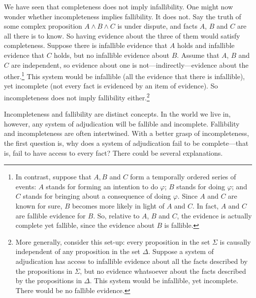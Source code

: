 \documentclass[
  10pt,
  dvipsnames,enabledeprecatedfontcommands]{scrartcl}
\begin{document}
We have seen that completeness does not imply infallibility. One might
now wonder whether incompleteness implies fallibility. It does not. Say
the truth of some complex proposition \(A \wedge B \wedge C\) is under
dispute, and facts \(A\), \(B\) and \(C\) are all there is to know. So
having evidence about the three of them would satisfy completeness.
Suppose there is infallible evidence that \(A\) holds and infallible
evidence that \(C\) holds, but no infallible evidence about \(B\).
Assume that \(A\), \(B\) and \(C\) are independent, so evidence about
one is not---indirectly---evidence about the other.\footnote{In
  contrast, suppose that \(A, B\) and \(C\) form a temporally ordered
  series of events: \(A\) stands for forming an intention to do
  \(\varphi\); \(B\) stands for doing \(\varphi\); and \(C\) stands for
  bringing about a consequence of doing \(\varphi\). Since \(A\) and
  \(C\) are known for sure, \(B\) becomes more likely in light of \(A\)
  and \(C\). In fact, \(A\) and \(C\) are fallible evidence for \(B\).
  So, relative to \(A\), \(B\) and \(C\), the evidence is actually
  complete yet fallible, since the evidence about \(B\) is fallible.}
This system would be infallible (all the evidence that there is
infallible), yet incomplete (not every fact is evidenced by an item of
evidence). So incompleteness does not imply fallibility
either.\footnote{More generally, consider this set-up: every proposition
  in the set \(\Sigma\) is causally independent of any proposition in
  the set \(\Delta\). Suppose a system of adjudication has access to
  infallible evidence about all the facts described by the propositions
  in \(\Sigma\), but no evidence whatsoever about the facts described by
  the propositions in \(\Delta\). This system would be infallible, yet
  incomplete. There would be no fallible evidence.}

Incompleteness and fallibility are distinct concepts. In the world we
live in, however, any system of adjudication will be fallible and
incomplete. Fallibility and incompleteness are often intertwined. With a
better grasp of incompleteness, the first question is, why does a system
of adjudication fail to be complete---that is, fail to have access to
every fact? There could be several explanations.
\end{document}
